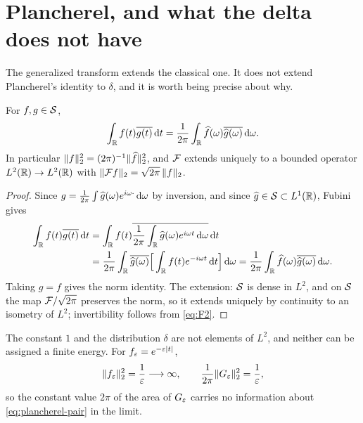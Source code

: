 \section{Plancherel, and what the delta does not have}

The generalized transform extends the classical one. It does not extend Plancherel's identity to
$\delta$, and it is worth being precise about why.

\begin{theorem}[Plancherel]\label{thm:plancherel}
For $f,g\in\mathcal{S}$,
\begin{equation}
\int_{\mathbb{R}}f(t)\overline{g(t)}\,\mathrm{d} t
=\frac{1}{2\pi}\int_{\mathbb{R}}\widehat{f}(\omega)\overline{\widehat{g}(\omega)}\,\mathrm{d}\omega .
\label{eq:plancherel-pair}
\end{equation}
In particular $\|f\|_{2}^{2}=(2\pi)^{-1}\|\widehat{f}\|_{2}^{2}$, and $\mathcal{F}$ extends uniquely to a bounded
operator $L^{2}(\mathbb{R})\to L^{2}(\mathbb{R})$ with $\|\mathcal{F} f\|_{2}=\sqrt{2\pi}\,\|f\|_{2}$.
\end{theorem}

\begin{proof}
Since $g=\frac{1}{2\pi}\int\widehat{g}(\omega)e^{i\omega\cdot}\,\mathrm{d}\omega$ by inversion, and since
$\widehat{g}\in\mathcal{S}\subset L^{1}(\mathbb{R})$, Fubini gives
\begin{align}
\int_{\mathbb{R}}f(t)\overline{g(t)}\,\mathrm{d} t
&=\int_{\mathbb{R}}f(t)\overline{\frac{1}{2\pi}\int_{\mathbb{R}}\widehat{g}(\omega)e^{i\omega t}\,\mathrm{d}\omega}\,\mathrm{d} t \notag\\
&=\frac{1}{2\pi}\int_{\mathbb{R}}\overline{\widehat{g}(\omega)}\Big[\int_{\mathbb{R}}f(t)e^{-i\omega t}\,\mathrm{d} t\Big]\,\mathrm{d}\omega
=\frac{1}{2\pi}\int_{\mathbb{R}}\widehat{f}(\omega)\overline{\widehat{g}(\omega)}\,\mathrm{d}\omega .
\end{align}
Taking $g=f$ gives the norm identity. The extension: $\mathcal{S}$ is dense in $L^{2}$, and on $\mathcal{S}$ the map
$\mathcal{F}/\sqrt{2\pi}$ preserves the norm, so it extends uniquely by continuity to an isometry of $L^{2}$;
invertibility follows from \eqref{eq:F2}.
\end{proof}

\begin{corollary}\label{cor:no-energy}
The constant $1$ and the distribution $\delta$ are not elements of $L^{2}$, and neither can be
assigned a finite energy. For $f_{\varepsilon}=e^{-\varepsilon|t|}$,
\begin{equation}
\|f_{\varepsilon}\|_{2}^{2}=\frac{1}{\varepsilon}\longrightarrow\infty,
\qquad
\frac{1}{2\pi}\|G_{\varepsilon}\|_{2}^{2}=\frac{1}{\varepsilon},
\end{equation}
so the constant value $2\pi$ of the area of $G_{\varepsilon}$ carries no information about
\eqref{eq:plancherel-pair} in the limit.
\end{corollary}

